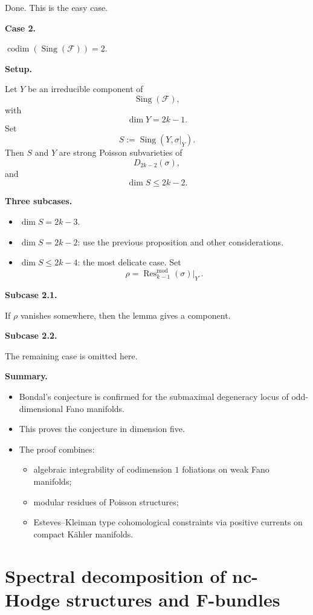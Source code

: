 Done.
This is the easy case.

\medskip\noindent
{\bf Case 2.}

$\operatorname{codim}
(\operatorname{Sing}(\mathcal F))=2$.

\medskip\noindent
{\bf Setup.}

Let $Y$ be an irreducible component of
\[
\operatorname{Sing}(\mathcal F),
\]
with
$$
\dim Y=2k-1.
$$
Set
$$
S:=\operatorname{Sing}
(Y,\sigma|_Y).
$$
Then $S$ and $Y$ are strong Poisson
subvarieties of
$$
D_{2k-2}(\sigma),
$$
and
$$
\dim S\leq 2k-2.
$$

\medskip\noindent
{\bf Three subcases.}

\begin{itemize}
\item $\dim S=2k-3$.
\item $\dim S=2k-2$:
use the previous proposition and other
considerations.
\item $\dim S\leq 2k-4$:
the most delicate case.
Set
$$
\rho=
\operatorname{Res}^{\mathrm{mod}}_{k-1}
(\sigma)|_{Y^\circ}.
$$
\end{itemize}

\medskip\noindent
{\bf Subcase 2.1.}

If $\rho$ vanishes somewhere, then the
lemma gives a component.

\medskip\noindent
{\bf Subcase 2.2.}

The remaining case is omitted here.

\medskip\noindent
{\bf Summary.}

\begin{itemize}
\item Bondal's conjecture is confirmed
for the submaximal degeneracy locus of
odd-dimensional Fano manifolds.
\item This proves the conjecture in
dimension five.
\item The proof combines:
\begin{itemize}
\item algebraic integrability of
codimension $1$ foliations on weak Fano
manifolds;
\item modular residues of Poisson
structures;
\item Esteves--Kleiman type cohomological
constraints via positive currents on
compact K\"ahler manifolds.
\end{itemize}
\end{itemize}

\section{Spectral decomposition of
nc-Hodge structures and F-bundles}
\label{section-nc-hodge-spectral}

